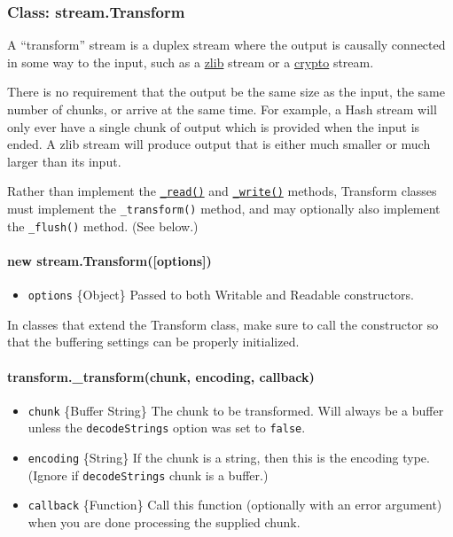 \subsubsection{Class: stream.Transform}\label{class-stream.transform-1}

A ``transform'' stream is a duplex stream where the output is causally
connected in some way to the input, such as a \href{zlib.html}{zlib}
stream or a \href{crypto.html}{crypto} stream.

There is no requirement that the output be the same size as the input,
the same number of chunks, or arrive at the same time. For example, a
Hash stream will only ever have a single chunk of output which is
provided when the input is ended. A zlib stream will produce output that
is either much smaller or much larger than its input.

Rather than implement the
\hyperref[streamux5freadableux5freadux5fsizeux5f1]{\texttt{\_read()}}
and
\hyperref[streamux5fwritableux5fwriteux5fchunkux5fencodingux5fcallbackux5f1]{\texttt{\_write()}}
methods, Transform classes must implement the \texttt{\_transform()}
method, and may optionally also implement the \texttt{\_flush()} method.
(See below.)

\paragraph{new
stream.Transform({[}options{]})}\label{new-stream.transformoptions}

\begin{itemize}
\itemsep1pt\parskip0pt
\item
  \texttt{options} \{Object\} Passed to both Writable and Readable
  constructors.
\end{itemize}

In classes that extend the Transform class, make sure to call the
constructor so that the buffering settings can be properly initialized.

\paragraph{transform.\_transform(chunk, encoding,
callback)}\label{transform.ux5ftransformchunk-encoding-callback}

\begin{itemize}
\itemsep1pt\parskip0pt
\item
  \texttt{chunk} \{Buffer \textbar{} String\} The chunk to be
  transformed. Will always be a buffer unless the \texttt{decodeStrings}
  option was set to \texttt{false}.
\item
  \texttt{encoding} \{String\} If the chunk is a string, then this is
  the encoding type. (Ignore if \texttt{decodeStrings} chunk is a
  buffer.)
\item
  \texttt{callback} \{Function\} Call this function (optionally with an
  error argument) when you are done processing the supplied chunk.
\end{itemize}

